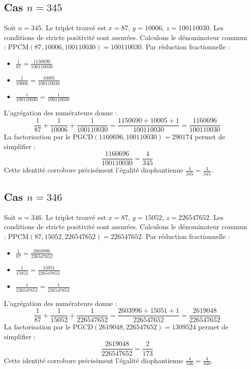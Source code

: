 \documentclass[11pt,a4paper]{article}
\begin{document}
\subsection{Cas $n = 345$}
Soit $n = 345$. Le triplet trouvé est $x = 87$, $y = 10006$, $z = 100110030$.
Les conditions de stricte positivité sont assurées.
Calculons le dénominateur commun : $\text{PPCM}(87, 10006, 100110030) = 100110030$.
Par réduction fractionnelle :
\begin{itemize}
    \item $\frac{1}{87} = \frac{1150690}{100110030}$
    \item $\frac{1}{10006} = \frac{10005}{100110030}$
    \item $\frac{1}{100110030} = \frac{1}{100110030}$
\end{itemize}
L'agrégation des numérateurs donne :
$$ \frac{1}{87} + \frac{1}{10006} + \frac{1}{100110030} = \frac{1150690 + 10005 + 1}{100110030} = \frac{1160696}{100110030} $$
La factorisation par le $\text{PGCD}(1160696, 100110030) = 290174$ permet de simplifier :
$$ \frac{1160696}{100110030} = \frac{4}{345} $$
Cette identité corrobore précisément l'égalité diophantienne $\frac{4}{345} = \frac{4}{345}$.

\subsection{Cas $n = 346$}
Soit $n = 346$. Le triplet trouvé est $x = 87$, $y = 15052$, $z = 226547652$.
Les conditions de stricte positivité sont assurées.
Calculons le dénominateur commun : $\text{PPCM}(87, 15052, 226547652) = 226547652$.
Par réduction fractionnelle :
\begin{itemize}
    \item $\frac{1}{87} = \frac{2603996}{226547652}$
    \item $\frac{1}{15052} = \frac{15051}{226547652}$
    \item $\frac{1}{226547652} = \frac{1}{226547652}$
\end{itemize}
L'agrégation des numérateurs donne :
$$ \frac{1}{87} + \frac{1}{15052} + \frac{1}{226547652} = \frac{2603996 + 15051 + 1}{226547652} = \frac{2619048}{226547652} $$
La factorisation par le $\text{PGCD}(2619048, 226547652) = 1309524$ permet de simplifier :
$$ \frac{2619048}{226547652} = \frac{2}{173} $$
Cette identité corrobore précisément l'égalité diophantienne $\frac{4}{346} = \frac{4}{346}$.
\end{document}
